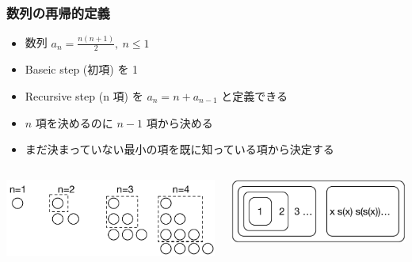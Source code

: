 \begin{frame}
\frametitle{数列の再帰的定義}
  \begin{itemize}
\item 数列 \(a_n=\frac{n(n+1)}{2},\ n\leq 1\)
\item Baseic step (初項) を 1
\item Recursive step (n 項) を \(a_n=n+a_{n-1}\) と定義できる
\item \(n\) 項を決めるのに \(n-1\) 項から決める
\item まだ決まっていない最小の項を既に知っている項から決定する
  \end{itemize}
  \begin{columns}
    \begin{column}[t]{0.4\textwidth}
      \begin{center}
\includegraphics[scale=0.4]{./Figure/elementaryCS-figTriangular.pdf}
      \end{center}
    \end{column}
    \begin{column}[t]{0.4\textwidth}
      \begin{center}
\includegraphics[scale=0.4]{./Figure/elementaryCS-2nd-figRecursion.pdf}
      \end{center}
    \end{column}
  \end{columns}
\end{frame}
